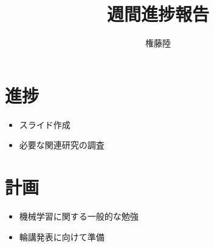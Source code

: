 \documentclass[dvipdfmx]{jsarticle}
\begin{document}
\title{週間進捗報告}
\author{権藤陸}
\maketitle
\section{進捗}
\begin{itemize}
    \item スライド作成
    \item 必要な関連研究の調査
\end{itemize}

\section{計画}
\begin{itemize}
    \item 機械学習に関する一般的な勉強
    \item 輪講発表に向けて準備
\end{itemize}
\end{document}
